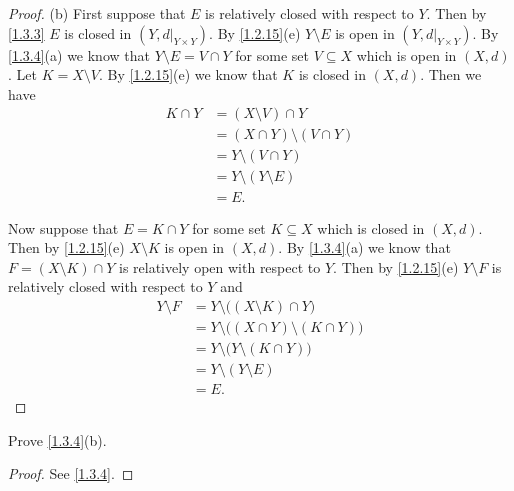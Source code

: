 \begin{proof}{(b)}
  First suppose that \(E\) is relatively closed with respect to \(Y\).
  Then by \cref{1.3.3} \(E\) is closed in \((Y, d|_{Y \times Y})\).
  By \cref{1.2.15}(e) \(Y \setminus E\) is open in \((Y, d|_{Y \times Y})\).
  By \cref{1.3.4}(a) we know that \(Y \setminus E = V \cap Y\) for some set \(V \subseteq X\) which is open in \((X, d)\).
  Let \(K = X \setminus V\).
  By \cref{1.2.15}(e) we know that \(K\) is closed in \((X, d)\).
  Then we have
  \begin{align*}
    K \cap Y & = (X \setminus V) \cap Y          \\
             & = (X \cap Y) \setminus (V \cap Y) \\
             & = Y \setminus (V \cap Y)          \\
             & = Y \setminus (Y \setminus E)     \\
             & = E.
  \end{align*}

  Now suppose that \(E = K \cap Y\) for some set \(K \subseteq X\) which is closed in \((X, d)\).
  Then by \cref{1.2.15}(e) \(X \setminus K\) is open in \((X, d)\).
  By \cref{1.3.4}(a) we know that \(F = (X \setminus K) \cap Y\) is relatively open with respect to \(Y\).
  Then by \cref{1.2.15}(e) \(Y \setminus F\) is relatively closed with respect to \(Y\) and
  \begin{align*}
    Y \setminus F & = Y \setminus \big((X \setminus K) \cap Y\big)          \\
                  & = Y \setminus \big((X \cap Y) \setminus (K \cap Y)\big) \\
                  & = Y \setminus \big(Y \setminus (K \cap Y)\big)          \\
                  & = Y \setminus (Y \setminus E)                           \\
                  & = E.
  \end{align*}
\end{proof}

\exercisesection

\begin{ex}\label{ex:1.3.1}
  Prove \cref{1.3.4}(b).
\end{ex}

\begin{proof}
  See \cref{1.3.4}.
\end{proof}